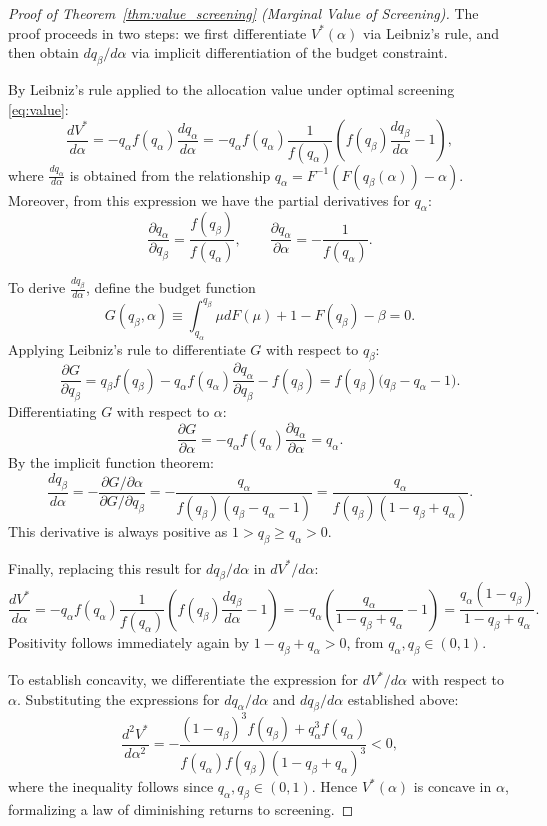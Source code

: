 \begin{proof}[Proof of Theorem~\ref{thm:value_screening} (Marginal Value of Screening)]
The proof proceeds in two steps: we first differentiate $V^*(\alpha)$ via Leibniz's rule, and then obtain $dq_{\beta}/d\alpha$ via implicit differentiation of the budget constraint.

By Leibniz's rule applied to the allocation value under optimal screening \eqref{eq:value}:
$$\frac{dV^*}{d\alpha} = -q_{\alpha} f(q_\alpha) \frac{dq_{\alpha}}{d\alpha} = -q_{\alpha} f(q_\alpha)\frac{1}{f(q_{\alpha})}\left(f(q_{\beta})\frac{dq_{\beta}}{d\alpha} - 1\right),$$
where $\frac{dq_{\alpha}}{d\alpha}$ is obtained from the relationship $q_{\alpha} = F^{-1}(F(q_{\beta}(\alpha)) - \alpha)$. Moreover, from this expression we have the partial derivatives for $q_\alpha$:
$$\frac{\partial q_{\alpha}}{\partial q_{\beta}} = \frac{f(q_\beta)}{f(q_{\alpha})}, \qquad
\frac{\partial q_{\alpha}}{\partial \alpha} = -\frac{1}{f(q_{\alpha})}.$$

To derive $\frac{dq_{\beta}}{d\alpha}$, define the budget function
$$ G(q_{\beta}, \alpha) \equiv \int_{q_{\alpha}}^{q_{\beta}} \mu dF(\mu) + 1 - F(q_{\beta}) - \beta =0.$$
Applying Leibniz's rule to differentiate $G$ with respect to $q_{\beta}$:
$$\frac{\partial G}{\partial q_{\beta}} = q_{\beta} f(q_{\beta}) - q_{\alpha} f(q_{\alpha}) \frac{\partial q_{\alpha}}{\partial q_{\beta}} - f(q_{\beta}) = f(q_{\beta})\bigl(q_{\beta} - q_{\alpha} - 1\bigr).$$
Differentiating $G$ with respect to $\alpha$:
$$\frac{\partial G}{\partial \alpha} = -q_{\alpha} f(q_{\alpha}) \frac{\partial q_{\alpha}}{\partial \alpha} = q_{\alpha}.$$
By the implicit function theorem:
$$\frac{dq_{\beta}}{d\alpha} = -\frac{\partial G / \partial \alpha}{\partial G / \partial q_{\beta}} = -\frac{q_{\alpha}}{f(q_{\beta})(q_{\beta} - q_{\alpha} - 1)} = \frac{q_{\alpha}}{f(q_{\beta})(1 - q_{\beta} + q_{\alpha})}.$$
This derivative is always positive as $1 > q_{\beta} \geq  q_{\alpha} > 0$. %

Finally, replacing this result for $dq_{\beta}/d\alpha$ in $dV^*/d\alpha$:
$$\frac{dV^*}{d\alpha} = -q_{\alpha} {f(q_{\alpha})} \frac{1}{f(q_{\alpha})}\left(f(q_{\beta})\frac{dq_{\beta}}{d\alpha} - 1\right)= -q_{\alpha}\left(\frac{q_{\alpha}}{1 - q_{\beta} + q_{\alpha}} - 1\right) = \frac{q_{\alpha}(1 - q_{\beta})}{1 - q_{\beta} + q_{\alpha}}.$$
Positivity follows immediately again by $1 - q_{\beta} + q_{\alpha} > 0$, from $q_\alpha, q_\beta \in (0,1)$.


To establish concavity, we differentiate the expression for $dV^*/d\alpha$ with respect to $\alpha$. Substituting the expressions for $dq_\alpha/d\alpha$
and $dq_\beta/d\alpha$ established above:
$$\frac{d^2V^*}{d\alpha^2} = -\frac{(1-q_\beta)^3 f(q_\beta) + q_\alpha^3 f(q_\alpha)}{f(q_\alpha)f(q_\beta)(1-q_{\beta} + q_{\alpha})^3} < 0,$$
where the inequality follows since $q_\alpha, q_\beta \in (0,1)$. Hence $V^*(\alpha)$ is concave in $\alpha$, formalizing a law of diminishing returns to screening.

\end{proof}



